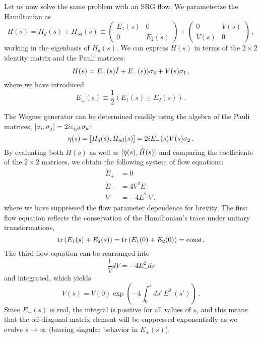 {Let us now solve the same problem with an SRG flow. We parameterize the Hamiltonian
as
\begin{equation}
  H(s) = H_d(s) + H_{od}(s) \equiv \begin{pmatrix}E_1(s) & 0 \\ 0 & E_2(s)\end{pmatrix} + 
         \begin{pmatrix} 0 & V(s) \\ V(s) & 0\end{pmatrix}\,,
\end{equation}
working in the eigenbasis of $H_d(s)$. We can express $H(s)$ in terms of the $2\times2$ 
identity matrix and the Pauli matrices:
\begin{equation}
  H(s) = E_{+}(s) \hat{I} + E_{-}(s))\sigma_3 
         + V(s)\sigma_1\,,
\end{equation}
where we have introduced
\begin{equation}
  E_{\pm}(s) \equiv \frac{1}{2}\left(E_1(s) \pm E_2(s)\right)\,.
\end{equation}

The Wegner generator can be determined readily using the algebra of
the Pauli matrices,
$[{\sigma_i},{\sigma_j}]=2i\varepsilon_{ijk}\sigma_k$:
\begin{equation}
  \eta(s) = [{H_d(s)},{H_{od}(s)}] = 2 i E_{-}(s) V(s) \sigma_2\,.
\end{equation}
By evaluating both $\dot{H}(s)$ as well as $[{\hat{\eta}(s)},{\hat{H}(s)}]$
and comparing the coefficients of the $2\times2$ matrices, we obtain the
following system of flow equations:
\begin{align}
  \dot{E}_+ & = 0 \label{eq:flow_Eplus}\\
  \dot{E}_{-} &= 4 V^2 E_{-} \label{eq:flow_Eminus}\\
  \dot{V}     &= -4 E_{-}^2V \label{eq:flow_V}\,,
\end{align}
where we have suppressed the flow parameter dependence for brevity.
The first flow equation reflects the conservation of the Hamiltonian's
trace under unitary transformations,
\begin{equation}
  \mathrm{tr}\, (E_1(s) + E_2(s)) = \mathrm{tr}\, (E_1(0) + E_2(0)) = \text{const.}
\end{equation} 
The third flow equation can be rearranged into
\begin{equation}
  \frac{1}{V}dV = - 4 E_{-}^2 ds
\end{equation}
and integrated, which yields
\begin{equation}
  V(s) = V(0)\exp\left(-4\int_0^sds'\,E^2_{-}(s') \right)\,.
\end{equation}
Since $E_{-}(s)$ is real, the integral is positive for all values
of $s$, and this means that the off-diagonal matrix element will 
be suppressed exponentially as we evolve $s\to\infty$ (barring
singular behavior in $E_{\pm}(s)$).

}
